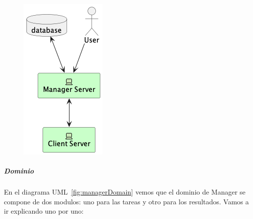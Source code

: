 \begin{figure}[H]
    \centering
    \includegraphics[height=0.4\textheight]{./part/Proyecto_ejecutivo/memoria_descriptiva/descripcionDelProyecto/manager/uml/managerServerConcept}
    \caption[Diagrama componentes]{}\label{fig:managerServerConcept}
\end{figure}

\subparagraph{Dominio}

En el diagrama UML~\ref{fig:managerDomain} vemos que el dominio de Manager se compone de dos modulos: uno para las tareas y otro para los resultados. Vamos a ir explicando uno por uno:


